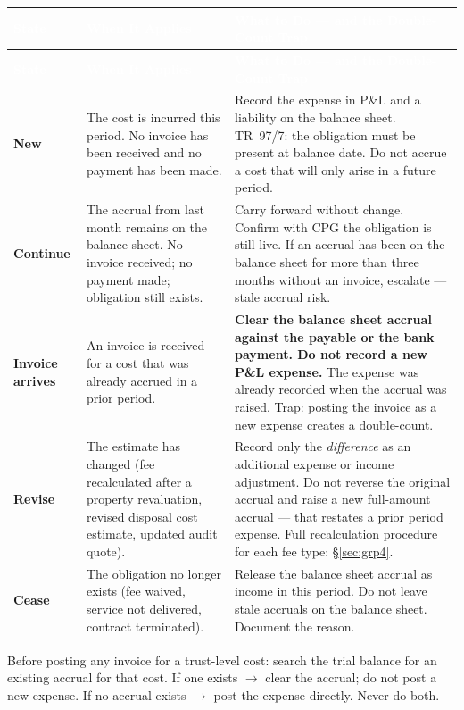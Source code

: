 \documentclass[10pt,a4paper]{article}
\begin{document}
{\small\sffamily
\begin{longtable}{@{} L{2.0cm} L{3.0cm} L{7.7cm} @{}}
\textcolor{white}{\bfseries State} & \textcolor{white}{\bfseries When It Applies} & \textcolor{white}{\bfseries What to Do --- and the Double-Count Trap} \\
\midrule
\endfirsthead
{}\textcolor{white}{\bfseries State} & \textcolor{white}{\bfseries When It Applies} & \textcolor{white}{\bfseries What to Do --- and the Double-Count Trap} \\
\midrule
\endhead
\textbf{New} & The cost is incurred this period. No invoice has been received and no payment has been made. & Record the expense in P\&L and a liability on the balance sheet. TR~97/7: the obligation must be present at balance date. Do not accrue a cost that will only arise in a future period. \\
\textbf{Continue} & The accrual from last month remains on the balance sheet. No invoice received; no payment made; obligation still exists. & Carry forward without change. Confirm with CPG the obligation is still live. If an accrual has been on the balance sheet for more than three months without an invoice, escalate --- stale accrual risk. \\
\textbf{Invoice arrives} & An invoice is received for a cost that was already accrued in a prior period. & \textbf{Clear the balance sheet accrual against the payable or the bank payment. Do not record a new P\&L expense.} The expense was already recorded when the accrual was raised. Trap: posting the invoice as a new expense creates a double-count. \\
\textbf{Revise} & The estimate has changed (fee recalculated after a property revaluation, revised disposal cost estimate, updated audit quote). & Record only the \emph{difference} as an additional expense or income adjustment. Do not reverse the original accrual and raise a new full-amount accrual --- that restates a prior period expense. Full recalculation procedure for each fee type: \S\ref{sec:grp4}. \\
\textbf{Cease} & The obligation no longer exists (fee waived, service not delivered, contract terminated). & Release the balance sheet accrual as income in this period. Do not leave stale accruals on the balance sheet. Document the reason. \\
\bottomrule
\end{longtable}}

\begin{note}
Before posting any invoice for a trust-level cost: search the trial balance for an existing accrual for that cost. If one exists $\to$ clear the accrual; do not post a new expense. If no accrual exists $\to$ post the expense directly. Never do both.
\end{note}
\end{document}

